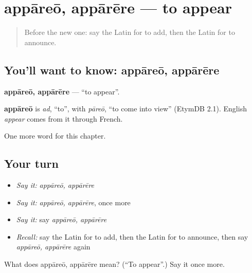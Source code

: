 \section[appāreō, appārēre]{appāreō, appārēre — to appear}

\label{lesson:LA-C230-appareo}



\begin{quote}
Before the new one: say the Latin for to add, then the Latin for to announce.
\end{quote}

\subsection*{You'll want to know: appāreō, appārēre}
\textbf{appāreō, appārēre} — \textquotedblleft{}to appear\textquotedblright{}.

\begin{cousinweb}
\textbf{appāreō} is \emph{ad}, \textquotedblleft{}to\textquotedblright{}, with \emph{pāreō}, \textquotedblleft{}to come into view\textquotedblright{} (EtymDB 2.1). English \emph{appear} comes from it through French.
\end{cousinweb}

\begin{grammarlens}[title={What you've built}]
One more word for this chapter.
\end{grammarlens}

\subsection*{Your turn}
\begin{itemize}
\raggedright
  \item \emph{Say it:} \emph{appāreō, appārēre}
  \item \emph{Say it:} \emph{appāreō, appārēre}, once more
  \item \emph{Say it:} say \emph{appāreō, appārēre}
  \item \emph{Recall:} say the Latin for to add, then the Latin for to announce, then say \emph{appāreō, appārēre} again
\end{itemize}

\begin{tcolorbox}[breakable,colback=teal!4,colframe=teal!35!black,title={Before you move on}]
What does appāreō, appārēre mean? (\textquotedblleft{}To appear\textquotedblright{}.) Say it once more.
\end{tcolorbox}
